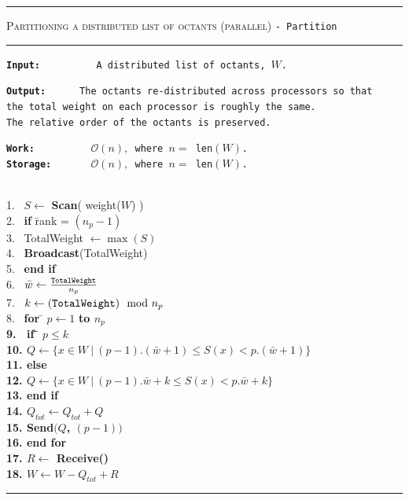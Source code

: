 \begin{table}
\centering
\rule{\textwidth}{0.01mm}
\begin{algorithm}{ \textsc{Partitioning a distributed list of octants
(parallel)} \tt{- Partition}}
\rule{\textwidth}{0.01mm}
\flushleft
\tt{\bf{Input:~~~~~~~~~~}}A distributed list of octants, $W$. \\
\begin{tabbing}
\tt{\bf{Output:~~~~~}} \= \tt{The octants re-distributed across processors so that}\\
\> \tt{the total weight on each processor is roughly the same.}\\
\> \tt{The relative order of the octants is preserved.}
\end{tabbing}
\tt{\bf{Work:~~~~~~~~~}} $\mathcal{O}(n),$ where $n =$ len$(W)$.\\
\tt{\bf{Storage:~~~~~~}} $\mathcal{O}(n),$ where $n = $ len$(W)$.\\
~\\
\begin{tabbing}   
   1.~ $S \leftarrow$ {\bf Scan}( weight($W$) ) \\
   2.~ {\bf if} \=rank = $(n_p -1)$ \\
   3.~ \> TotalWeight $\leftarrow  \max(S)$\\   
   4.~ \> {\bf Broadcast}(TotalWeight)\\
   5.~ {\bf end if} \\
   6.~ $\bar{w} \leftarrow  \frac{{\tt TotalWeight}}{n_p} $\\
   7.~ $k \leftarrow ({\tt TotalWeight})\mod n_p$ \\
   8.~ {\bf for} \= $p \leftarrow 1$ \bf{to} $n_p$\\
   9.~ \> {\bf if} \= $p \leq k$\\
   10. \>\> $Q \leftarrow \{x \in W ~|~ (p-1).(\bar{w}+1) \leq S(x) < p.(\bar{w}+1) \}$ \\
   11. \> {\bf else} \\
   12. \>\> $Q \leftarrow \{x \in W ~|~ (p-1).\bar{w}+k \leq S(x) < p.\bar{w}+k \}$ \\
   13. \> {\bf end if}\\
   14. \> $Q_{tot} \leftarrow Q_{tot} + Q$ \\
   15. \> {\bf Send}$(Q$, $(p-1))$ \\
   16. {\bf end for}\\
   17. $R \leftarrow$ {\bf Receive}() \\
   18. $W \leftarrow W - Q_{tot} + R$   
\end{tabbing}
\label{alg:partW}
\end{algorithm}
\rule{\textwidth}{0.01mm}
\end{table}


